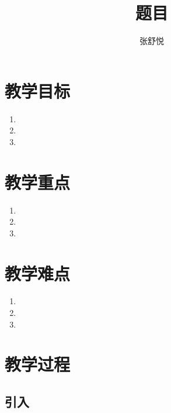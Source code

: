 \documentclass{article}
\begin{document}
\begin{CJK}{UTF8}{gkai}

\title{题目}
\date{}
\author{张舒悦}
\maketitle

\section{教学目标}
\begin{enumerate}
\item 
\item 
\item 
\end{enumerate}

\section{教学重点}
\begin{enumerate}
\item 
\item 
\item 
\end{enumerate}

\section{教学难点}
\begin{enumerate}
\item 
\item 
\item 
\end{enumerate}

\section{教学过程}
\subsection{引入}
\subsubsection{}
\subsubsection{}


\end{CJK}
\end{document}
